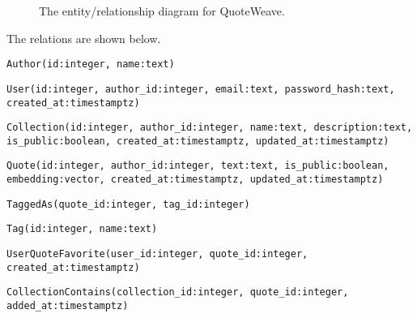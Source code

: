 \documentclass{article}
\begin{document}
\begin{figure}
  \caption{The entity/relationship diagram for QuoteWeave.\label{fig:er}}
\end{figure}

The relations are shown below.

\texttt{Author(id:integer, name:text)}

\texttt{User(id:integer, author\_id:integer, email:text, password\_hash:text, created\_at:timestamptz)}

\texttt{Collection(id:integer, author\_id:integer, name:text, description:text, is\_public:boolean, created\_at:timestamptz, updated\_at:timestamptz)}

\texttt{Quote(id:integer, author\_id:integer, text:text, is\_public:boolean, embedding:vector, created\_at:timestamptz, updated\_at:timestamptz)}

\texttt{TaggedAs(quote\_id:integer, tag\_id:integer)}

\texttt{Tag(id:integer, name:text)}

\texttt{UserQuoteFavorite(user\_id:integer, quote\_id:integer, created\_at:timestamptz)}

\texttt{CollectionContains(collection\_id:integer, quote\_id:integer, added\_at:timestamptz)}
\end{document}

